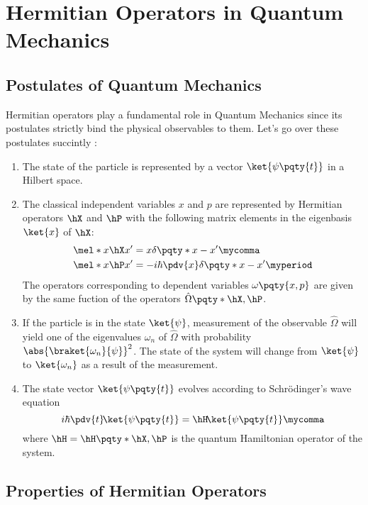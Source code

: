 \chapter{Hermitian Operators in Quantum Mechanics}\label{ch:hermitian}
    \section{Postulates of Quantum Mechanics}
        Hermitian operators play a fundamental role in Quantum Mechanics since its postulates strictly bind the physical observables to them. Let's go over these postulates succintly \cite{Shankar2012-kg}:
        \begin{enumerate}[label=\Roman*.]
            \item The state of the particle is represented by a vector $\ket{\psi\pqty{t}}$ in a Hilbert space.
            \item The classical independent variables $x$ and $p$ are represented by Hermitian operators $\hX$ and $\hP$ with the following matrix elements in the eigenbasis $\ket{x}$ of $\hX$:
            \begin{align*}
                \mel*{x}{\hX}{x'} &= x\delta\pqty*{x-x'} \mycomma \\
                \mel*{x}{\hP}{x'} &= -i\hbar\pdv{x}\delta\pqty*{x-x'} \myperiod
            \end{align*}
            The operators corresponding to dependent variables $\omega\pqty{x,p}$ are given by the same fuction of the operators $\hat{\Omega}\pqty*{\hX,\hP}$.
            \item If the particle is in the state $\ket{\psi}$, measurement of the observable $\hat{\Omega}$ will yield one of the eigenvalues $\omega_n$ of $\hat{\Omega}$ with probability $\abs{\braket{\omega_n}{\psi}}^2$. The state of the system will change from $\ket{\psi}$ to $\ket{\omega_n}$ as a result of the measurement.
            \item The state vector $\ket{\psi\pqty{t}}$ evolves according to Schr\"odinger's wave equation
            \begin{equation}
                i\hbar\pdv{t}\!\ket{\psi\pqty{t}} = \hH\!\ket{\psi\pqty{t}}
                \mycomma
                \label{eq:schrodinger}
            \end{equation}
            where $\hH = \hH\pqty*{\hX,\hP}$ is the quantum Hamiltonian operator of the system.
        \end{enumerate}
    \section{Properties of Hermitian Operators}\cite{Bender2005}